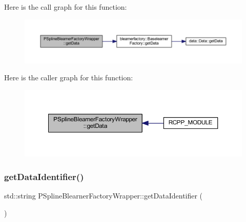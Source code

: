 Here is the call graph for this function\+:
\nopagebreak
\begin{figure}[H]
\begin{center}
\leavevmode
\includegraphics[width=350pt]{class_p_spline_blearner_factory_wrapper_a7613c56ca05f36f8365a1d5987bbf823_cgraph}
\end{center}
\end{figure}
Here is the caller graph for this function\+:
\nopagebreak
\begin{figure}[H]
\begin{center}
\leavevmode
\includegraphics[width=350pt]{class_p_spline_blearner_factory_wrapper_a7613c56ca05f36f8365a1d5987bbf823_icgraph}
\end{center}
\end{figure}
\mbox{\label{class_p_spline_blearner_factory_wrapper_a909646ea1efe420d71c8159ab2305fc8}} 
\subsubsection{\texorpdfstring{get\+Data\+Identifier()}{getDataIdentifier()}}
{\footnotesize\ttfamily std\+::string P\+Spline\+Blearner\+Factory\+Wrapper\+::get\+Data\+Identifier (\begin{DoxyParamCaption}{ }\end{DoxyParamCaption})\hspace{0.3cm}{\ttfamily [inline]}}


